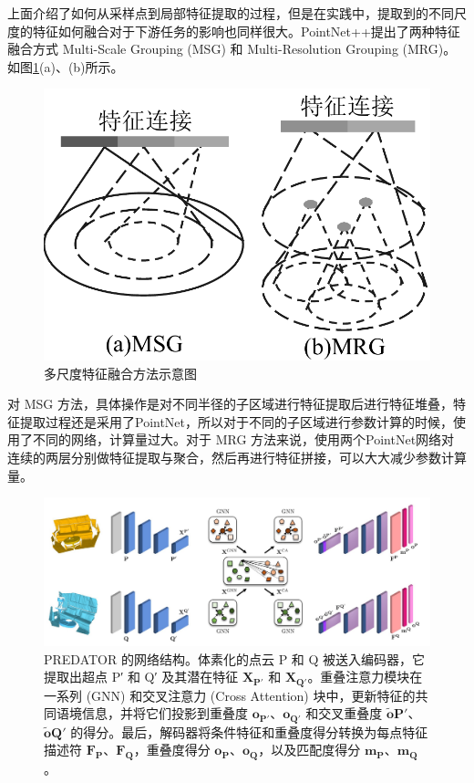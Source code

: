 上面介绍了如何从采样点到局部特征提取的过程，但是在实践中，提取到的不同尺度的特征如何融合对于下游任务的影响也同样很大。PointNet++提出了两种特征融合方式 Multi-Scale Grouping (MSG) 和 Multi-Resolution Grouping (MRG)。如图\ref{fig:pnpp_grouping}(a)、(b)所示。

\begin{figure}
    \vspace{-5mm}
    \centering
    \includegraphics[width=0.45\linewidth]{images/pnpp_group.pdf}
    \caption{多尺度特征融合方法示意图}
    \label{fig:pnpp_grouping}
    \vspace{-0cm}
\end{figure}

对 MSG 方法，具体操作是对不同半径的子区域进行特征提取后进行特征堆叠，特征提取过程还是采用了PointNet，所以对于不同的子区域进行参数计算的时候，使用了不同的网络，计算量过大。对于 MRG 方法来说，使用两个PointNet网络对连续的两层分别做特征提取与聚合，然后再进行特征拼接，可以大大减少参数计算量。

\begin{figure}
    \vspace{-5mm}
    \centering
    \includegraphics[width=\linewidth]{images/PREDATOR.pdf}
    \caption{
        PREDATOR 的网络结构。体素化的点云 P 和 Q 被送入编码器，它提取出超点 P′ 和 Q′ 及其潜在特征 $\boldsymbol{X_{P'}}$ 和 $\boldsymbol{X_{Q'}}$。重叠注意力模块在一系列 (GNN) 和交叉注意力 (Cross Attention) 块中，更新特征的共同语境信息，并将它们投影到重叠度 $\boldsymbol{o_{P'}}$、$\boldsymbol{o_{Q'}}$ 和交叉重叠度 $\boldsymbol{\tilde{o}{P'}}$、$\boldsymbol{\tilde{o}{Q'}}$ 的得分。最后，解码器将条件特征和重叠度得分转换为每点特征描述符 $\boldsymbol{F_{P}}$、$\boldsymbol{F_{Q}}$，重叠度得分 $\boldsymbol{o_{P}}$、$\boldsymbol{o_{Q}}$，以及匹配度得分 $\boldsymbol{m_{P}}$、$\boldsymbol{m_{Q}}$。}
    \label{fig:predator}
    \vspace{-5mm}
\end{figure}

